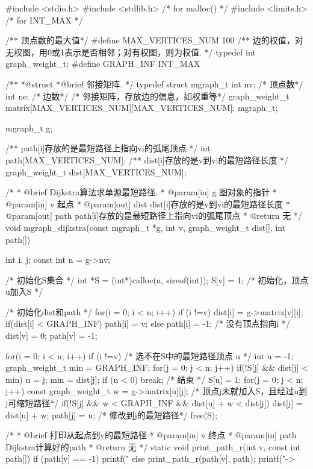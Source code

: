 \begin{Codex}[label=mgraph_dijkstra.c]
#include <stdio.h>
#include <stdlib.h>  /* for malloc() */
#include <limits.h>  /* for INT_MAX */

/** 顶点数的最大值*/
#define MAX_VERTICES_NUM 100
/** 边的权值，对无权图，用0或1表示是否相邻；对有权图，则为权值. */
typedef int graph_weight_t;
#define GRAPH_INF INT_MAX

/**
 *@struct
 *@brief 邻接矩阵.
 */
typedef struct mgraph_t {
    int nv; /* 顶点数*/
    int ne; /* 边数*/
    /* 邻接矩阵，存放边的信息，如权重等*/
    graph_weight_t matrix[MAX_VERTICES_NUM][MAX_VERTICES_NUM];
} mgraph_t;

mgraph_t g;

/** path[i]存放的是最短路径上指向vi的弧尾顶点 */
int path[MAX_VERTICES_NUM];
/** dist[i]存放的是v到vi的最短路径长度 */
graph_weight_t dist[MAX_VERTICES_NUM];


/*
  * @brief Dijkstra算法求单源最短路径.
  * @param[in] g 图对象的指针
  * @param[in] v 起点
  * @param[out] dist dist[i]存放的是v到vi的最短路径长度
  * @param[out] path path[i]存放的是最短路径上指向vi的弧尾顶点
  * @return 无
  */
void mgraph_dijkstra(const mgraph_t *g, int v, graph_weight_t dist[], int path[]) {
    int i, j;
    const int n = g->nv;

    /* 初始化S集合 */
    int *S = (int*)calloc(n, sizeof(int));
    S[v] = 1; /* 初始化，顶点u加入S */

    /* 初始化dist和path */
    for(i = 0; i < n; i++) if (i !=v) {
        dist[i] = g->matrix[v][i];
        if(dist[i] < GRAPH_INF) {
            path[i] = v;
        }  else {
            path[i] = -1; /* 没有顶点指向i */
        }
    }
    dist[v] = 0;
    path[v] = -1;

    for(i = 0; i < n; i++) if (i !=v) {
        /* 选不在S中的最短路径顶点 u */
        int u = -1;
        graph_weight_t min = GRAPH_INF;
        for(j = 0; j < n; j++) {
            if(!S[j] && dist[j] < min) {
                u = j;
                min = dist[j];
            }
        }
        if (u < 0) break; /* 结束 */
        S[u] = 1;
        for(j = 0; j < n; j++) {
            const graph_weight_t w = g->matrix[u][j];
            /* 顶点j未就加入S，且经过u到j可缩短路径*/
            if(!S[j] && w < GRAPH_INF &&
                dist[u] + w < dist[j]) {
                dist[j] = dist[u] + w;
                path[j] = u; /* 修改到j的最短路径*/
            }
        }
    }
    free(S);
}

/*
 * @brief 打印从起点到v的最短路径
 * @param[in] v 终点
 * @param[in] path Dijkstra计算好的path
 * @return 无
 */
static void print_path_r(int v, const int path[]) {
    if (path[v] == -1) {
        printf("%
    } else {
        print_path_r(path[v], path);
        printf("->%
    }
}


\end{Codex}
